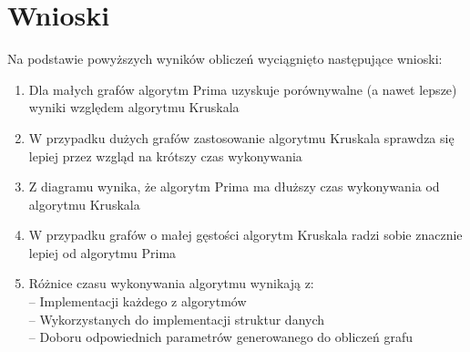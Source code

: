 \newpage
\section{Wnioski}
\fancyhead[L]{}
\fancyhead[R]{}
\label{conclusion}
Na podstawie powyższych wyników obliczeń wyciągnięto następujące wnioski:
\begin{enumerate}
	\item Dla małych grafów algorytm Prima uzyskuje porównywalne (a nawet lepsze) wyniki względem algorytmu Kruskala
	\item W przypadku dużych grafów zastosowanie algorytmu Kruskala sprawdza się lepiej przez wzgląd na krótszy czas wykonywania 
	\item Z diagramu wynika, że algorytm Prima ma dłuższy czas wykonywania od algorytmu Kruskala
	\item W przypadku grafów o małej gęstości algorytm Kruskala radzi sobie znacznie lepiej od algorytmu Prima
	\item Różnice czasu wykonywania algorytmu wynikają z:\\
	-- Implementacji każdego z algorytmów\\
	-- Wykorzystanych do implementacji struktur danych\\
	-- Doboru odpowiednich parametrów generowanego do obliczeń grafu
\end{enumerate}


